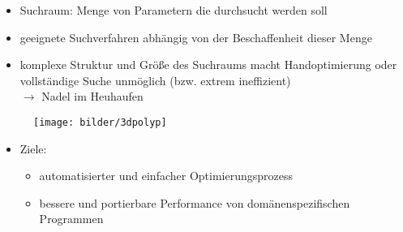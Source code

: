 
    \begin{frame}
    
    \begin{itemize}
      \item Suchraum: Menge von Parametern die durchsucht werden soll
      \item geeignete Suchverfahren abhängig von der Beschaffenheit dieser Menge
      \item komplexe Struktur und Größe des Suchraums macht Handoptimierung oder vollständige Suche
      unmöglich (bzw. extrem ineffizient) \\ $\rightarrow$ Nadel im Heuhaufen
    \end{itemize}
      
    \begin{figure}[ht]
      \centering	      
      \texttt{[image: bilder/3dpolyp]}
      \label{3dpoly}
    \end{figure}
    
    \begin{itemize}
      \item Ziele:
      \begin{itemize}
        \item automatisierter und einfacher Optimierungsprozess
        \item bessere und portierbare Performance von domänenspezifischen Programmen
      \end{itemize}
    \end{itemize}

    \end{frame}
    
    
      
